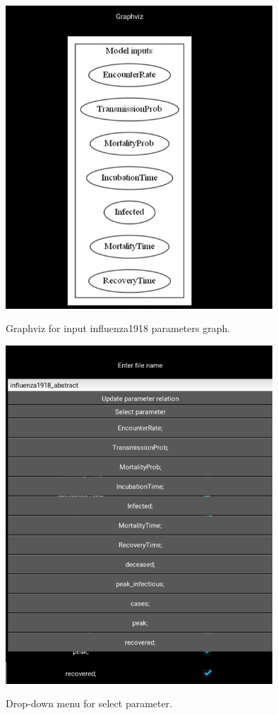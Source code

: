 \begin{figure}[H]
	\centering
	\includegraphics[width=10cm]{figures/influenzaTestProcess4.png}\\
	\caption{Graphviz for input influenza1918 parameters graph.}
	\label{fig:figure22}
\end{figure}
\begin{figure}[H]
	\centering
	\includegraphics[width=10cm]{figures/influenzaTestProcess6.png}\\
	\caption{Drop-down menu for select parameter.}
	\label{fig:figure24}
\end{figure}
